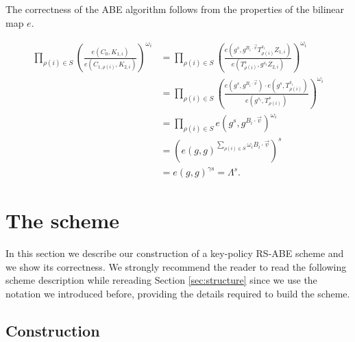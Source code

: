\documentclass[a4paper,10pt]{article}
\begin{document}
The correctness of the ABE algorithm follows from the properties of the bilinear map $e$.
	
	\begin{align*}
		\prod_{\rho(i)\in S} \left( \frac{e(C_0,K_{1,i})}{e(C_{1,\rho(i)},K_{2,i})} \right)^{\omega_{i}} &= \prod_{\rho(i)\in S} \left( \frac{e(g^s,g^{B_i\cdot \vec{v}} T_{\rho(i)}^{s_i} Z_{1,i})}{e(T_{\rho(i)}^s,g^{s_i} Z_{2,i})} \right)^{\omega_{i}} \\
		&= \prod_{\rho(i)\in S} \left( \frac{e(g^s,g^{B_i\cdot \vec{v}})\cdot e(g^s,T_{\rho(i)}^{s_i})}{e(g^{s_i},T_{\rho(i)}^{s})} \right)^{\omega_{i}} \\
		&= \prod_{\rho(i)\in S} e(g^s,g^{B_i\cdot \vec{v}})^{\omega_{i}} \\
		&= \left( e(g,g) ^{\sum_{\rho(i)\in S}\omega_{i}B_i\cdot \vec{v}}\right)^s \\
		&= e(g,g)^{\gamma s} = \Lambda^{s}.
	\end{align*}
	
	\pagebreak
	\section{The scheme}\label{sec:scheme}
	
	In this section we describe our construction of a key-policy RS-ABE scheme and we show its correctness. We strongly recommend the reader to read the following scheme description while rereading Section \ref{sec:structure} since we use the notation we introduced before, providing the details required to build the scheme.
	
	\subsection{Construction}
	
\end{document}
